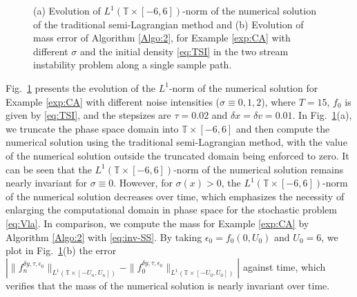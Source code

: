 \documentclass[11pt,reqno]{amsproc}
\numberwithin{equation}{section}
\begin{document}
\begin{figure}[!htbp]
	\centering
	\hspace{4em}
	\caption{\textup{(}a\textup{)} Evolution of $L^1(\mathbb T\times[-6,6])$-norm of the numerical solution of the traditional semi-Lagrangian method and \textup{(}b\textup{)} Evolution of mass error 
	of Algorithm \ref{Algo:2}, 	
	for Example \ref{exp:CA} with different $\sigma$ and the initial density \eqref{eq:TSI} in the two stream instability problem along a single sample path.
	}\label{Fig:L1} 
\end{figure}
Fig.\ \ref{Fig:L1} presents the evolution of the $L^1$-norm of the numerical solution for Example \ref{exp:CA} with different noise intensities ($\sigma\equiv0,1,2$), where $T=15$, $f_0$ is given by \eqref{eq:TSI}, and the stepsizes are $\tau=0.02$ and $\delta x=\delta v=0.01$.
In Fig.\ \ref{Fig:L1}(a), we truncate the phase space domain into $\mathbb{T} \times [-6, 6]$ and then compute the numerical solution using the traditional semi-Lagrangian method, with the value of the numerical solution outside the truncated domain being enforced to zero.
 It can be seen that the $L^1(\mathbb T\times[-6,6])$-norm of the numerical solution remains nearly invariant for $\sigma\equiv0$. However, for $\sigma(x)>0$, the $L^1(\mathbb T\times[-6,6])$-norm of the numerical solution decreases over time, which 
emphasizes the necessity of enlarging the computational domain in phase space for the stochastic problem \eqref{eq:Vla}.
In comparison, we compute the mass for Example \ref{exp:CA} by
Algorithm \ref{Algo:2} with \eqref{eq:inv-SS}.
 By taking $\epsilon_0=f_0(0,U_0)$ and $U_0=6$, we plot in
Fig.\ \ref{Fig:L1}(b) the error $|\|f^{\delta y,\tau,\epsilon_0}_n\|_{L^1(\mathbb T\times[-U_n,U_n])}-\|f^{\delta y,\tau,\epsilon_0}_0\|_{L^1(\mathbb T\times[-U_0,U_0])}|$ against time, which verifies that the mass of the numerical solution is nearly invariant over time.
\end{document}
